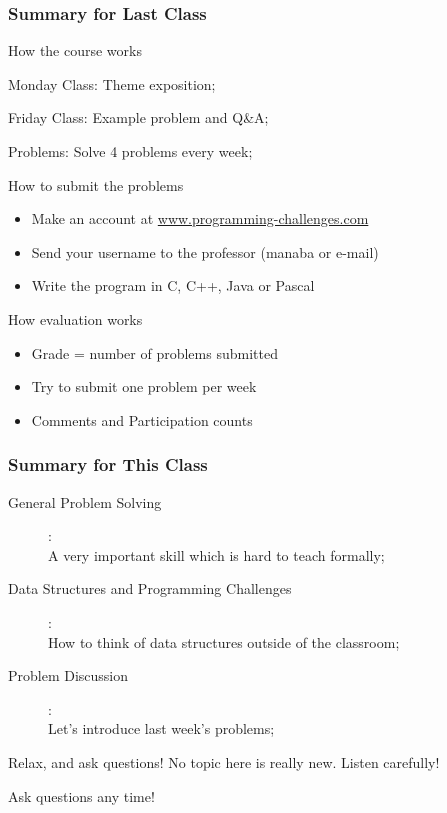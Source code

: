 \documentclass{beamer}
\begin{document}
\begin{frame}
  \frametitle{Summary for Last Class}
  \begin{exampleblock}{How the course works}
    \begin{itemize}
      {\smaller
    \item Monday Class: Theme exposition;
    \item Friday Class: Example problem and Q\&A;
    \item Problems: Solve 4 problems every week;
      }
    \end{itemize}
  \end{exampleblock}
  \begin{exampleblock}{How to submit the problems}
    {\smaller
    \begin{itemize}
    \item Make an account at \url{www.programming-challenges.com}
    \item Send your username to the professor (manaba or e-mail)
    \item Write the program in C, C++, Java or Pascal
    \end{itemize}}
  \end{exampleblock}
  \begin{exampleblock}{How evaluation works}
    {\smaller
    \begin{itemize}
    \item Grade = number of problems submitted
    \item Try to submit one problem per week
    \item Comments and Participation counts
    \end{itemize}}
  \end{exampleblock}
  
\end{frame}

\begin{frame}
  \frametitle{Summary for This Class}
  \begin{description}
    \item[General Problem Solving]:\\ A very important skill which is hard to teach formally;
      \vspace{.5cm}
    \item[Data Structures and Programming Challenges]:\\ How to think of
      data structures outside of the classroom;
      \vspace{.5cm}
    \item[Problem Discussion]:\\ Let's introduce last week's problems;
  \end{description}

  \begin{exampleblock}{Relax, and ask questions!}
    No topic here is really new. Listen carefully!
    
    \bigskip
    
    Ask questions any time!
  \end{exampleblock}
\end{frame}
\end{document}
